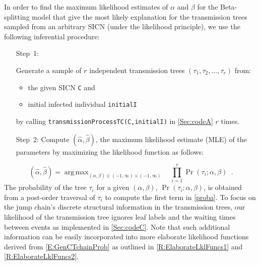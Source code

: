 \documentclass[review]{elsarticle}
\numberwithin{equation}{section}
\let\orgautoref\autoref
\renewcommand{\autoref}
        {\def\equationautorefname{Eq.}%
         \def\figureautorefname{Fig.}%
         \def\subfigureautorefname{Fig.}%
         \def\sectionautorefname{Sect.}%
         \def\subsectionautorefname{Sect.}%
         \def\subsubsectionautorefname{Sect.}%
         \def\Itemautorefname{item}%
         \def\tableautorefname{Table}%
         \def\propositionautorefname{Prop.}%
         \def\corollaryautorefname{Corollary}%
         \def\theoremautorefname{Theorem}%
         \def\remarkautorefname{Remark}%
         \def\lemmaautorefname{Lemma}%
         \def\proofofautorefname{Proof}%
         \def\exampleautorefname{Example}%
         \orgautoref}
\providecommand{\autorefs}
        {\def\equationautorefname{Eqs.}%
         \def\figureautorefname{Figs.}%
         \def\subfigureautorefname{Figs.}%
         \def\sectionautorefname{Sects.}%
         \def\subsectionautorefname{Sects.}%
         \def\subsubsectionautorefname{Sects.}%
         \def\Itemautorefname{items}%
         \def\tableautorefname{Tables}%
         \def\propositionautorefname{Props.}%
         \def\theoremautorefname{Theorems}%
         \def\theoremautorefname{Remarks}%
         \def\lemmaautorefname{Lemmas}%
         \def\proofofautorefname{Proofs}%
         \def\exampleautorefname{Examples}%
         \orgautoref}
\DeclareMathOperator*{\argmax}{arg\,max}
\begin{document}
In order to find the maximum likelihood estimates of $\alpha$ and $\beta$ for the Beta-splitting model that give the most likely explanation for the transmission trees sampled from an arbitrary SICN (under the likelihood principle), we use the following inferential procedure:
\begin{enumerate} 
\item[Step~1:]{Generate a sample of $r$ independent transmission trees $(\tau_1,\tau_2,\ldots,\tau_r)$ from:
\begin{itemize}
\item the given SICN {\tt C} and 
\item initial infected individual {\tt initialI} 
\end{itemize}
by calling {\tt transmissionProcessTC(C,initialI)} in \autoref{Sec:codeA} $r$ times.}
\item[Step~2:]{Compute $(\widehat{\alpha},\widehat{\beta})$, the maximum likelihood estimate (MLE) of the parameters by maximizing the likelihood function as follows:}
\end{enumerate}
\[
(\widehat{\alpha},\widehat{\beta}) = \argmax_{(\alpha,\beta) \in (-1,\infty) \times (-1,\infty)} \quad \prod_{i=1}^r \Pr(\tau_i; \alpha, \beta) \enspace.
\]
The probability of the tree $\tau_i$ for a given $(\alpha, \beta)$, $\Pr(\tau_i; \alpha, \beta)$, is obtained from a post-order traversal of $\tau_i$ to compute the first term in \autoref{proba}.  
To focus on the jump chain's discrete structural information in the transmission trees, our likelihood of the transmission tree ignores leaf labels and the waiting times between events as implemented in \autoref{Sec:codeC}.  
Note that such additional information can be easily incorporated into more elaborate likelihood functions derived from \autoref{E:GenCTchainProb} as outlined in \autorefs{R:ElaborateLklFuncs1} and \ref{R:ElaborateLklFuncs2}.  
\end{document}

